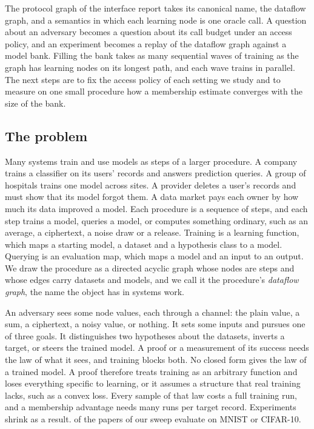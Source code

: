 \documentclass{labreport}
\begin{document}
\lrchanges
The protocol graph of the interface report takes its canonical name, the
dataflow graph, and a semantics in which each learning node is one oracle call.
A question about an adversary becomes a question about its call budget under an
access policy, and an experiment becomes a replay of the dataflow graph against
a model bank. Filling the bank takes as many sequential waves of training as the
graph has learning nodes on its longest path, and each wave trains in parallel.
The next steps are to fix the access policy of each setting we study and to
measure on one small procedure how a membership estimate converges with the
size of the bank.

\lrmethod
\subsection*{The problem}
Many systems train and use models as steps of a larger procedure. A company
trains a classifier on its users' records and answers prediction queries. A group
of hospitals trains one model across sites. A provider deletes a user's records
and must show that its model forgot them. A data market pays each owner by how
much its data improved a model. Each procedure is a sequence of steps, and each
step trains a model, queries a model, or computes something ordinary, such as an
average, a ciphertext, a noise draw or a release. Training is a learning
function, which maps a starting model, a dataset and a hypothesis class to a
model. Querying is an evaluation map, which maps a model and an input to an
output. We draw the procedure as a directed acyclic graph whose nodes are steps
and whose edges carry datasets and models, and we call it the procedure's
\emph{dataflow graph}, the name the object has in systems work.

An adversary sees some node values, each through a channel: the plain value, a
sum, a ciphertext, a noisy value, or nothing. It sets some inputs and pursues one
of three goals. It distinguishes two hypotheses about the datasets, inverts a
target, or steers the trained model. A proof or a measurement of its success
needs the law of what it sees, and training blocks both. No closed form gives
the law of a trained model. A proof therefore treats training as an arbitrary
function and loses everything specific to learning, or it assumes a structure
that real training lacks, such as a convex loss. Every sample of that law costs a
full training run, and a membership advantage needs many runs per target record.
Experiments shrink as a result.  of the 
papers of our sweep evaluate on MNIST or CIFAR-10.
\end{document}
